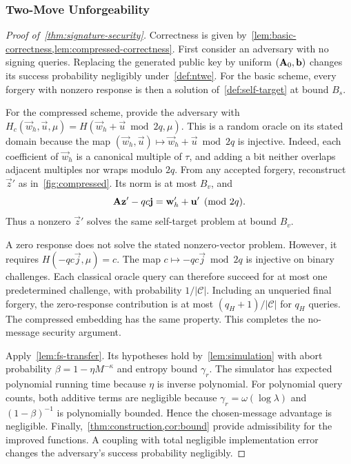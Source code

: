\subsubsection{Two-Move Unforgeability}

\begin{proof}[Proof of~\cref{thm:signature-security}]
Correctness is given by~\cref{lem:basic-correctness,lem:compressed-correctness}. First consider an adversary with no signing queries. Replacing the generated public key by uniform $(\mathbf{A}_0,\mathbf{b})$ changes its success probability negligibly under~\cref{def:ntwe}. For the basic scheme, every forgery with nonzero response is then a solution of~\cref{def:self-target} at bound $B_s$.

For the compressed scheme, provide the adversary with $H_c(\vec{w}_{h},\vec u,\mu)=H(\vec{w}_{h}+\vec u\bmod2q,\mu)$. This is a random oracle on its stated domain because the map $(\vec{w}_{h},\vec u)\mapsto\vec{w}_{h}+\vec u\bmod2q$ is injective. Indeed, each coefficient of $\vec{w}_{h}$ is a canonical multiple of $\tau$, and adding a bit neither overlaps adjacent multiples nor wraps modulo $2q$. From any accepted forgery, reconstruct $\vec z'$ as in~\cref{fig:compressed}. Its norm is at most $B_v$, and
\[
 \mathbf{A}\mathbf{z}'-qc\mathbf{j}=\mathbf{w}_{h}'+\mathbf{u}'\pmod{2q}.
\]
Thus a nonzero $\vec z'$ solves the same self-target problem at bound $B_v$.

A zero response does not solve the stated nonzero-vector problem. However, it requires $H(-qc\vec j,\mu)=c$. The map $c\mapsto-qc\vec j\bmod2q$ is injective on binary challenges. Each classical oracle query can therefore succeed for at most one predetermined challenge, with probability $1/|\mathcal C|$. Including an unqueried final forgery, the zero-response contribution is at most $(q_H+1)/|\mathcal C|$ for $q_H$ queries. The compressed embedding has the same property. This completes the no-message security argument.

Apply~\cref{lem:fs-transfer}. Its hypotheses hold by~\cref{lem:simulation} with abort probability $\beta=1-\eta M^{-\kappa}$ and entropy bound $\gamma_r$. The simulator has expected polynomial running time because $\eta$ is inverse polynomial. For polynomial query counts, both additive terms are negligible because $\gamma_r=\omega(\log\lambda)$ and $(1-\beta)^{-1}$ is polynomially bounded. Hence the chosen-message advantage is negligible. Finally,~\cref{thm:construction,cor:bound} provide admissibility for the improved functions. A coupling with total negligible implementation error changes the adversary's success probability negligibly.
\end{proof}

